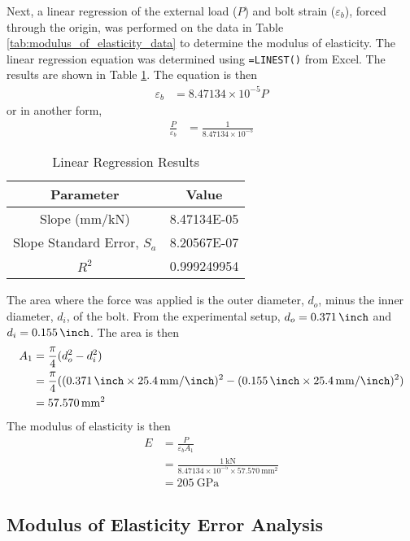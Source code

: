 Next, a linear regression of the external load ($P$) and bolt strain ($\varepsilon_b$), forced through the origin, was performed on the data in Table \ref{tab:modulus_of_elasticity_data} to determine the modulus of elasticity. The linear regression equation was determined using \texttt{=LINEST()} from Excel. The results are shown in Table \ref{tab:modulus_of_elasticity_regression}. The equation is then
\begin{align*}
    \varepsilon_b &= 8.47134 \times 10^{-5} P
\end{align*}
or in another form,
\begin{align*}
    \frac{P}{\varepsilon_b} &= \frac{1}{8.47134 \times 10^{-5}} 
\end{align*}
\begin{table}[h]
    \centering
    \caption{Linear Regression Results}
    \label{tab:modulus_of_elasticity_regression}
    \begin{tabular}{cc}
    \toprule
    Parameter & Value \\
    \midrule
    Slope (mm/kN) & 8.47134E-05 \\
    Slope Standard Error, $S_a$ & 8.20567E-07 \\
    $R^2$ & 0.999249954 \\
    \bottomrule
    \end{tabular}
\end{table}
The area where the force was applied is the outer diameter, $d_o$, minus the inner diameter, $d_i$, of the bolt. From the experimental setup, $d_o = \qty{0.371}{\inch}$ and $d_i = \qty{0.155}{\inch}$. The area is then
\begin{align*}
    A_1 &= \frac{\pi}{4} (d_o^2 - d_i^2) \\
    &= \frac{\pi}{4} ((\qty{0.371}{\inch}\times \qty{25.4}{\milli\meter\per\inch})^2 - (\qty{0.155}{\inch}\times \qty{25.4}{\milli\meter\per\inch})^2) \\
    &= \qty{57.570}{\milli\meter\squared}
\end{align*}
The modulus of elasticity is then
\begin{align*}
    E &= \frac{P}{\varepsilon_b A_1} \\
    &= \frac{\qty{1}{\kilo\newton}}{8.47134 \times 10^{-5} \times \qty{57.570}{\milli\meter\squared}} \\
    &= \boxed{\qty{205}{\giga\pascal}}
\end{align*}   

\subsection{Modulus of Elasticity Error Analysis}
